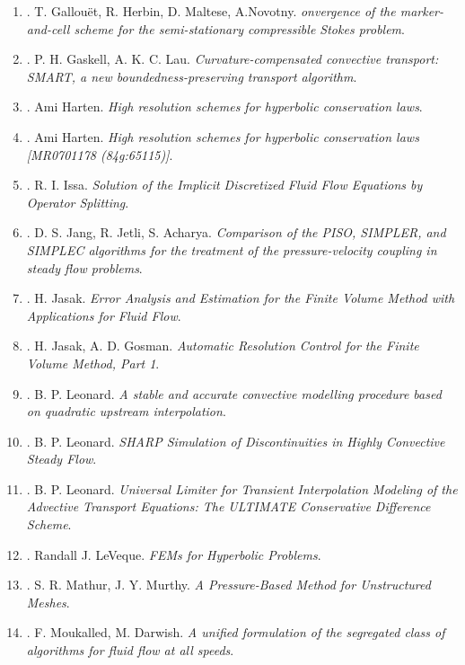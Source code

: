\documentclass{article}
\begin{document}
\begin{enumerate}
	\item \cite{Gallouet_Herbin_Maltese_Novotny2017}. {\sc T. Gallou\"{e}t, R. Herbin, D. Maltese, A.Novotny}. {\it onvergence of the marker-and-cell scheme for the semi-stationary compressible Stokes problem}.
	\item \cite{Gaskell_Lau1988}. {\sc P. H. Gaskell, A. K. C. Lau}. {\it Curvature-compensated convective transport: SMART, a new boundedness-preserving transport algorithm}.
	\item \cite{Harten1983}. {\sc Ami Harten}. {\it High resolution schemes for hyperbolic conservation laws}.
	\item \cite{Harten1997}. {\sc Ami Harten}. {\it High resolution schemes for hyperbolic conservation laws [{MR}0701178 (84g:65115)]}.
	\item \cite{Issa1986}. {\sc R. I. Issa}. {\it Solution of the Implicit Discretized Fluid Flow Equations by Operator Splitting}.
	\item \cite{Jang_Jetli_Acharya1986}. {\sc D. S. Jang, R. Jetli, S. Acharya}. {\it Comparison of the PISO, SIMPLER, and SIMPLEC algorithms for the treatment of the pressure-velocity coupling in steady flow problems}.
	\item \cite{Jasak1996}. {\sc H. Jasak}. {\it Error Analysis and Estimation for the Finite Volume Method with Applications for Fluid Flow}.
	\item \cite{Jasak_Gosman2000}. {\sc H. Jasak,  A. D. Gosman}. {\it Automatic Resolution Control for the Finite Volume  Method, Part 1}.
	\item \cite{Leonard1979}. {\sc B. P. Leonard}. {\it A stable and accurate convective modelling procedure based on quadratic upstream interpolation}.
	\item \cite{Leonard1987}. {\sc B. P. Leonard}. {\it SHARP Simulation of Discontinuities in Highly Convective Steady Flow}.
	\item \cite{Leonard1988}. {\sc B. P. Leonard}. {\it Universal Limiter for Transient Interpolation Modeling of the Advective Transport Equations: The ULTIMATE Conservative Difference Scheme}.
	\item \cite{LeVeque2002}. {\sc Randall J. LeVeque}. {\it FEMs for Hyperbolic Problems}.
	\item \cite{Mathur_Murthy1997}. {\sc S. R. Mathur, J. Y. Murthy}. {\it A Pressure-Based Method for Unstructured Meshes}.
	\item \cite{Moukalled_Darwish2000}. {\sc F. Moukalled, M. Darwish}. {\it A unified formulation of the segregated class of algorithms for fluid flow at all speeds}.

\end{enumerate}
\end{document}
